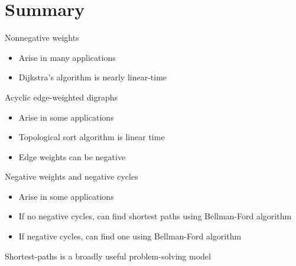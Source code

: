 \documentclass[8pt,a4paper,compress]{beamer}
\begin{document}
\section{Summary}
\begin{frame}[fragile]
\pause

Nonnegative weights
\begin{itemize}
\item Arise in many applications
\item Dijkstra's algorithm is nearly linear-time
\end{itemize}

\pause
\bigskip

Acyclic edge-weighted digraphs
\begin{itemize}
\item Arise in some applications
\item Topological sort algorithm is linear time
\item Edge weights can be negative
\end{itemize}

\pause
\bigskip

Negative weights and negative cycles
\begin{itemize}
\item Arise in some applications
\item If no negative cycles, can find shortest paths using Bellman-Ford algorithm
\item If negative cycles, can find one using Bellman-Ford algorithm
\end{itemize}

\pause
\bigskip

Shortest-paths is a broadly useful problem-solving model
\end{frame}
\end{document}
